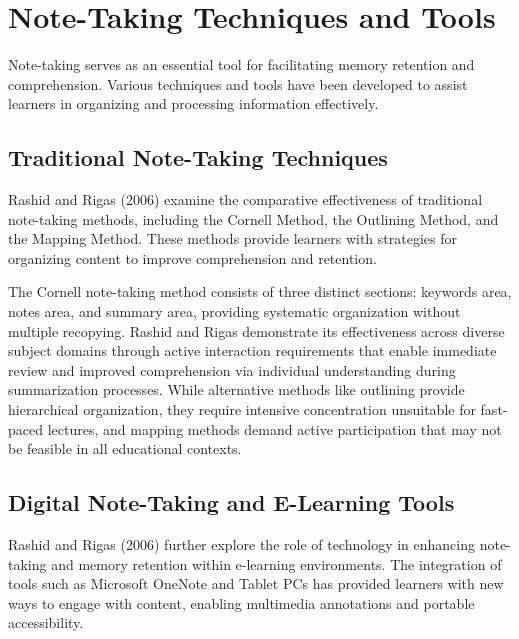 \section{Note-Taking Techniques and Tools}

Note-taking serves as an essential tool for facilitating memory retention and comprehension. Various techniques and tools have been developed to assist learners in organizing and processing information effectively.

\subsection{Traditional Note-Taking Techniques}

Rashid and Rigas (2006) examine the comparative effectiveness of traditional note-taking methods, including the Cornell Method, the Outlining Method, and the Mapping Method. These methods provide learners with strategies for organizing content to improve comprehension and retention.

{\color{maroon}
The Cornell note-taking method consists of three distinct sections: keywords area, notes area, and summary area, providing systematic organization without multiple recopying. Rashid and Rigas demonstrate its effectiveness across diverse subject domains through active interaction requirements that enable immediate review and improved comprehension via individual understanding during summarization processes. While alternative methods like outlining provide hierarchical organization, they require intensive concentration unsuitable for fast-paced lectures, and mapping methods demand active participation that may not be feasible in all educational contexts.
}

\subsection{Digital Note-Taking and E-Learning Tools}

Rashid and Rigas (2006) further explore the role of technology in enhancing note-taking and memory retention within e-learning environments. The integration of tools such as Microsoft OneNote and Tablet PCs has provided learners with new ways to engage with content, enabling multimedia annotations and portable accessibility.

